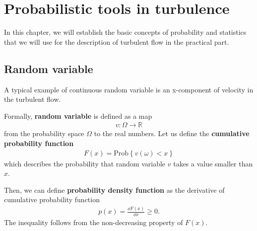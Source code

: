 \chapter{Probabilistic tools in turbulence}
In this chapter, we will establish the basic concepts of probability and statistics \cite{tur} that we will use for the description of turbulent flow in the practical part.


%
%
%
%
%
%
%
\section{Random variable}
A typical example of continuous random variable is an x-component of velocity in the turbulent flow.

Formally, \textbf{random variable} is defined as a map
\begin{align}
v: \Omega \rightarrow \mathbb{R}
\end{align}
from the probability space $\Omega$ to the real numbers.
%
Let us define the \textbf{cumulative probability function}
\begin{align}
F(x) = \mathrm{Prob}\left\{v(\omega) < x\right\}
\end{align}
which describes the probability that random variable $v$ takes a value smaller than $x$. 

Then, we can define \textbf{probability density function} as the derivative of cumulative probability function
\begin{align}
p(x) = \frac{\dd F(x)}{\dd x} \geq 0.
\end{align}
The inequality follows from the non-decreasing property of $F(x)$. 

